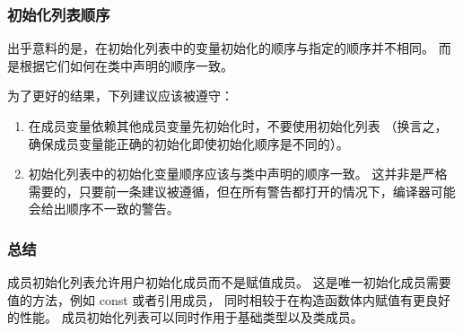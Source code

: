 \documentclass[../../LearnCpp.tex]{subfiles}
\begin{document}
\subsubsection*{初始化列表顺序}

出乎意料的是，在初始化列表中的变量初始化的顺序与指定的顺序并不相同。
而是根据它们如何在类中声明的顺序一致。

为了更好的结果，下列建议应该被遵守：

\begin{enumerate}
    \item 在成员变量依赖其他成员变量先初始化时，不要使用初始化列表
          （换言之，确保成员变量能正确的初始化即使初始化顺序是不同的）。
    \item 初始化列表中的初始化变量顺序应该与类中声明的顺序一致。
          这并非是严格需要的，只要前一条建议被遵循，但在所有警告都打开的情况下，编译器可能会给出顺序不一致的警告。
\end{enumerate}

\subsubsection*{总结}

成员初始化列表允许用户初始化成员而不是赋值成员。
这是唯一初始化成员需要值的方法，例如 const 或者引用成员，
同时相较于在构造函数体内赋值有更良好的性能。
成员初始化列表可以同时作用于基础类型以及类成员。
\end{document}

